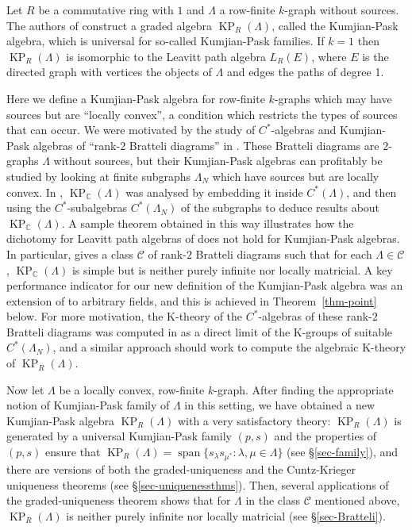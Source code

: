 \documentclass[a4paper,12pt]{amsart}
\numberwithin{equation}{section}
\theoremstyle{definition}
\theoremstyle{remark}
\begin{document}
Let $R$ be a commutative ring with $1$ and $\Lambda$ a row-finite $k$-graph without sources. The authors of \cite{ACaHR} construct 
a graded algebra $\operatorname{KP}_R(\Lambda)$, called the Kumjian-Pask algebra, which is universal for so-called Kumjian-Pask families.  
If $k=1$ then $\operatorname{KP}_R(\Lambda)$ is isomorphic to the Leavitt path algebra $L_R(E)$, 
where $E$ is the directed graph with vertices the objects of $\Lambda$ and edges the paths of degree 1.

Here we define a Kumjian-Pask algebra for row-finite $k$-graphs which may have sources but are ``locally convex'', a condition 
which restricts the types of sources that can occur.  We were motivated by the  study of $C^*$-algebras and Kumjian-Pask  
algebras of ``rank-$2$ Bratteli diagrams'' in \cite{PRRS, ACaHR}.  These Bratteli diagrams are $2$-graphs $\Lambda$ without 
sources, 
but their Kumjian-Pask algebras  can  profitably be studied by looking at finite subgraphs $\Lambda_N$ which have sources but are 
locally convex.  In \cite{ACaHR}, $\operatorname{KP}_{\mathbb{C}}(\Lambda)$ was analysed by embedding it inside  $C^*(\Lambda)$, and then using the 
$C^*$-subalgebras $C^*(\Lambda_N)$ of the subgraphs to deduce results about $\operatorname{KP}_{\mathbb{C}}(\Lambda)$. A sample theorem obtained 
in this way illustrates how the dichotomy for Leavitt path algebras of \cite[Theorem~4.5]{AA3} does not hold for Kumjian-Pask algebras.  
In particular, \cite[Theorem~7.10]{ACaHR} gives a class $\mathcal C$ of  rank-$2$ Bratteli diagrams such that 
for each $\Lambda \in \mathcal C$,  $\operatorname{KP}_{\mathbb{C}}(\Lambda)$ is 
simple but is neither purely infinite nor locally matricial.  A key performance indicator for our new definition of the
 Kumjian-Pask algebra was an extension of \cite[Theorem~7.10]{ACaHR} to arbitrary fields, and this is achieved in 
Theorem~\ref{thm-point} below.   For more motivation,  the K-theory of the $C^*$-algebras of these rank-$2$ Bratteli 
diagrams was computed in \cite{PRRS} as a direct limit of the K-groups of suitable $C^*(\Lambda_N)$, and a similar 
approach should work to compute the algebraic  K-theory of $\operatorname{KP}_R(\Lambda)$.

Now let $\Lambda$ be a locally convex, row-finite $k$-graph.   After finding the appropriate notion of Kumjian-Pask 
family of $\Lambda$ in this setting, we have obtained a new Kumjian-Pask algebra $\operatorname{KP}_R(\Lambda)$ with a very 
satisfactory theory: $\operatorname{KP}_R(\Lambda)$ is generated by a universal
Kumjian-Pask family $(p,s)$ and the properties of $(p,s)$ ensure that $\operatorname{KP}_R(\Lambda)={\operatorname{\mathrm{span}}}\{s_\lambda s_{\mu^*}:\lambda,\mu\in \Lambda\}$ (see \S\ref{sec-family}),   
and there are versions of both the graded-uniqueness and the Cuntz-Krieger uniqueness theorems (see \S\ref{sec-uniquenessthms}).  
Then, several applications of the graded-uniqueness theorem shows that for $\Lambda$ in the class $\mathcal C$ mentioned above, $\operatorname{KP}_R(\Lambda)$ is neither purely infinite nor locally matricial (see \S\ref{sec-Bratteli}).
\end{document}
